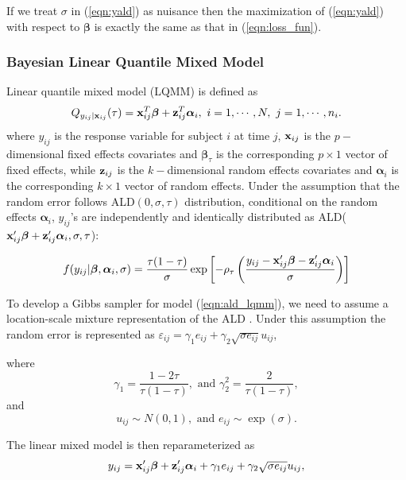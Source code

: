 \documentclass[12pt]{article}
\begin{document}
If we treat $\sigma$ in (\ref{eqn:yald}) as nuisance then the maximization of (\ref{eqn:yald}) with respect to $\boldsymbol{\beta}$ is exactly the same as that in (\ref{eqn:loss_fun}).



\subsubsection{Bayesian Linear Quantile Mixed Model}\label{sec:BLQMM}%

Linear quantile mixed model (LQMM) is defined as
\begin{equation}\label{eqn:lqmm}
Q_{y_{ij}|{\bf x}_{ij}}(\tau)={\bf x}_{ij}^{T}\boldsymbol{\beta} + {\bf z}_{ij}^{T}\boldsymbol{\alpha}_i,\ i=1, \cdots, N,\ j=1,\cdots, n_i.
\end{equation}
where $y_{ij}$ is the response variable for subject $i$ at time $j$, ${\bf x}_{ij}$ is the $p-$dimensional fixed effects covariates and $\boldsymbol{\beta}_{\tau}$ is the corresponding $p\times1$ vector of fixed effects, while ${\bf z}_{ij}$ is the $k-$dimensional random effects covariates and $\boldsymbol{\alpha}_i$ is the corresponding $k\times 1$ vector of random effects. Under the assumption that the random error follows ALD$(0, \sigma, \tau)$ distribution, conditional on the random effects $\boldsymbol{\alpha}_i$, $y_{ij}$'s are independently and identically distributed as ALD(${\bf x}_{ij}'\boldsymbol{\beta}+{\bf z}_{ij}'\boldsymbol{\alpha}_i, \sigma, \tau$):

\begin{equation}\label{eqn:ald_lqmm}
f(y_{ij}|\boldsymbol{\beta},\boldsymbol{\alpha}_i,\sigma)=\frac{\tau(1-\tau)}{\sigma}\exp\left[-\rho_{\tau}\left(\frac{y_{ij}-{\bf x}_{ij}'\boldsymbol{\beta}-{\bf z}_{ij}'\boldsymbol{\alpha}_i}{\sigma}\right)\right]
\end{equation}

To develop a Gibbs sampler for model (\ref{eqn:ald_lqmm}), we need to assume a location-scale mixture representation of the ALD \cite{kotz2001laplace}. Under this assumption the random error is represented as $\varepsilon_{ij}=\gamma_1e_{ij}+\gamma_2\sqrt{\sigma e_{ij}}u_{ij}$,

where \[\gamma_1=\frac{1-2\tau}{\tau(1-\tau)}, \mbox{ and } \gamma_2^2=\frac{2}{\tau(1-\tau)},\]
and \[u_{ij}\sim N(0,1), \mbox{ and } e_{ij}\sim\exp(\sigma).\]

The linear mixed model is then reparameterized as
\begin{equation}\label{eqn:reformald2}
y_{ij}={\bf x}_{ij}'\boldsymbol{\beta}+{\bf z}_{ij}'\boldsymbol{\alpha}_i+\gamma_1e_{ij}+\gamma_2\sqrt{\sigma e_{ij}}u_{ij},
\end{equation}
\end{document}

